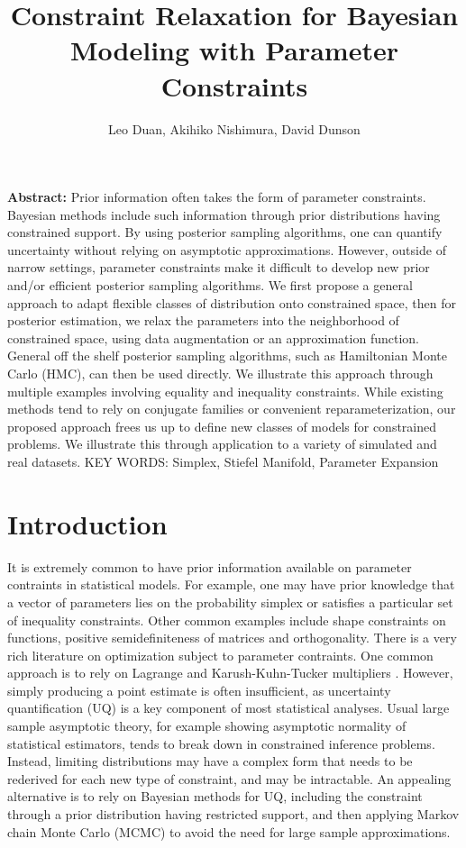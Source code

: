 \documentclass[10pt,fleqn]{article}
\title{\textbf{Constraint Relaxation for Bayesian Modeling with Parameter Constraints}}
\author{Leo Duan, Akihiko Nishimura, David Dunson}
\date{}
\DeclareMathOperator{\1}{\mathbbm{1}}
\begin{document}
\maketitle
{\bf Abstract:} Prior information often takes  the form of parameter constraints. Bayesian methods include such information through prior distributions having constrained support. By using posterior sampling algorithms, one can quantify uncertainty without relying on asymptotic approximations. However, outside of narrow settings, parameter constraints
make it difficult to develop new  prior and/or   efficient posterior sampling algorithms. We first propose a general approach to adapt flexible classes of distribution onto constrained space, 
  then  for posterior estimation, we relax the parameters  into the neighborhood of constrained
space, using data augmentation or  an  approximation function. General off the shelf posterior sampling algorithms, such as Hamiltonian Monte Carlo (HMC), can then be used directly. We illustrate this approach through multiple examples involving equality and inequality constraints. While existing methods tend to rely on conjugate families or convenient reparameterization, our proposed approach frees us up to define new classes of  models for constrained problems. We illustrate this through application to a variety of simulated and real datasets.
\vskip 12pt
{\noindent KEY WORDS: Simplex,  Stiefel Manifold, Parameter Expansion}
{}


\section{Introduction}
It is extremely common to have prior information available on parameter
contraints in statistical models. For example, one may have prior knowledge
that a vector of parameters lies on the probability simplex or satisfies a
particular set of inequality constraints. Other common examples include
shape constraints on functions, positive semidefiniteness of matrices and
orthogonality. There is a very rich literature on optimization subject to
parameter contraints. One common approach is to rely on Lagrange and
Karush-Kuhn-Tucker multipliers \citep{boyd2004convex}. However, simply
producing a point estimate is often insufficient, as uncertainty
quantification (UQ) is a key component of most statistical analyses. Usual
large sample asymptotic theory, for example showing asymptotic normality of
statistical estimators, tends to break down in constrained inference
problems. Instead, limiting distributions may have a complex form that
needs to be rederived for each new type of constraint, and may be
intractable. An appealing alternative is to rely on Bayesian methods for
UQ, including the constraint through a prior distribution having restricted
support, and then applying Markov chain Monte Carlo (MCMC) to avoid the
need for large sample approximations.
\end{document}
